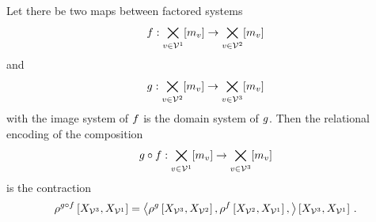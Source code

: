\begin{theorem}
    \label{the:compositionByContraction}
    Let there be two maps between factored systems
    \begin{align*}
        f : \bigtimes_{v\in\mathcal{V}^{1}}[m_{v}] \rightarrow \bigtimes_{v\in\mathcal{V}^{2}}[m_{v}]
    \end{align*}
    and
    \begin{align*}
        g : \bigtimes_{v\in\mathcal{V}^{2}}[m_{v}] \rightarrow \bigtimes_{v\in\mathcal{V}^{3}}[m_{v}]
    \end{align*}
    with the image system of $f$ is the domain system of $g$.
    Then the relational encoding of the composition
    \begin{align*}
        {g}\circ{f} : \bigtimes_{v\in\mathcal{V}^{1}}[m_{v}] \rightarrow \bigtimes_{v\in\mathcal{V}^{3}}[m_{v}]
    \end{align*}
    is the contraction
    \begin{align*}
        \rho^{{g}\circ{f}}\left[X_{\mathcal{V}^{3}},X_{\mathcal{V}^{1}}\right]
        = \left\langle 
            \rho^{g}\left[X_{\mathcal{V}^{3}},X_{\mathcal{V}^{2}}\right],
            \rho^{f}\left[X_{\mathcal{V}^{2}},X_{\mathcal{V}^{1}}\right],
        \right\rangle \left[ X_{\mathcal{V}^{3}},X_{\mathcal{V}^{1}} \right] \, .
    \end{align*}
\end{theorem}
